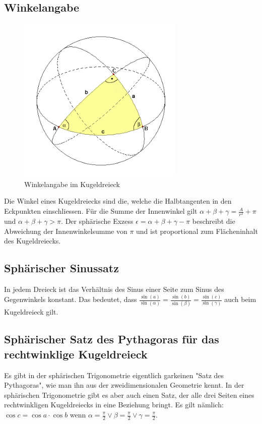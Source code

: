 \subsection{Winkelangabe}
\begin{figure}[h]
	
	\begin{center}
		\includegraphics[width=8cm]{papers/nav/bilder/kugel2.png}
		\caption[Winkelangabe im Kugeldreieck]{Winkelangabe im Kugeldreieck}
	\end{center}	
\end{figure}

Die Winkel eines Kugeldreiecks sind die, welche die Halbtangenten in den Eckpunkten einschliessen. 
Für die Summe der Innenwinkel gilt $\alpha+\beta+\gamma = \frac{A}{r^2} + \pi$ und
$\alpha+\beta+\gamma > \pi$.
Der sphärische Exzess $\epsilon = \alpha+\beta+\gamma - \pi$ beschreibt die Abweichung der Innenwinkelsumme von $\pi$ und ist proportional zum Flächeninhalt des Kugeldreiecks.

\subsection{Sphärischer Sinussatz}
In jedem Dreieck ist das Verhältnis des Sinus einer Seite zum Sinus des Gegenwinkels konstant. 
Das bedeutet, dass $\frac{\sin (a)}{\sin (\alpha)} =\frac{\sin (b)}{\sin (\beta)} = \frac{\sin (c)}{\sin (\gamma)} $ auch beim Kugeldreieck gilt.

\subsection{Sphärischer Satz des Pythagoras für das rechtwinklige Kugeldreieck}
Es gibt in der sphärischen Trigonometrie eigentlich garkeinen "Satz des Pythagoras", wie man ihn aus der zweidimensionalen Geometrie kennt.
In der sphärischen Trigonometrie gibt es aber auch einen Satz, der alle drei Seiten eines rechtwinkligen Kugeldreiecks in eine Beziehung bringt. 
Es gilt nämlich: $\cos c = \cos a \cdot \cos b$ wenn $\alpha= \frac{\pi}{2} \lor \beta=\frac{\pi}{2} \lor \gamma = \frac{\pi}{2} $.